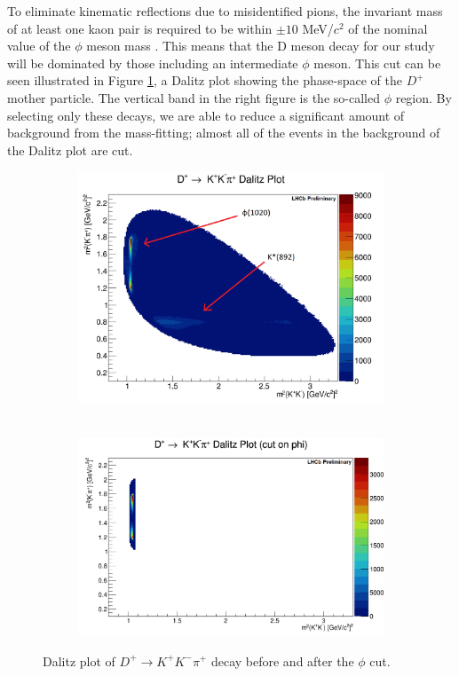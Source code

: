 \documentclass[12pt, letterpaper]{article}
\begin{document}
To eliminate kinematic reflections due to misidentified pions, the invariant mass of at least one kaon pair is required to be within $±10$ MeV/$c^2$ of the nominal value of the $\phi$ meson mass \cite{lhcb, kinematics}. This means that the D meson decay for our study will be dominated by those including an intermediate $\phi$ meson. This cut can be seen illustrated in Figure \ref{fig:dalitz}, a Dalitz plot showing the phase-space of the $D^+$ mother particle. The vertical band in the right figure is the so-called $\phi$ region. By selecting only these decays, we are able to reduce a significant amount of background from the mass-fitting; almost all of the events in the background of the Dalitz plot are cut. 


\begin{figure}[h!]
\centering
\begin{subfigure}{.5\textwidth}
  \centering
  \includegraphics[width=1\linewidth]{dalitz.png}\
\end{subfigure}%
\begin{subfigure}{.5\textwidth}
  \centering
  \includegraphics[width=1\linewidth]{dalitzcut.png}
\end{subfigure}
\caption{Dalitz plot of $D^{+} \rightarrow K^{+}K^{-}\pi^{+}$ decay before and after the $\phi$ cut.}
\label{fig:dalitz}
\end{figure}
\end{document}
